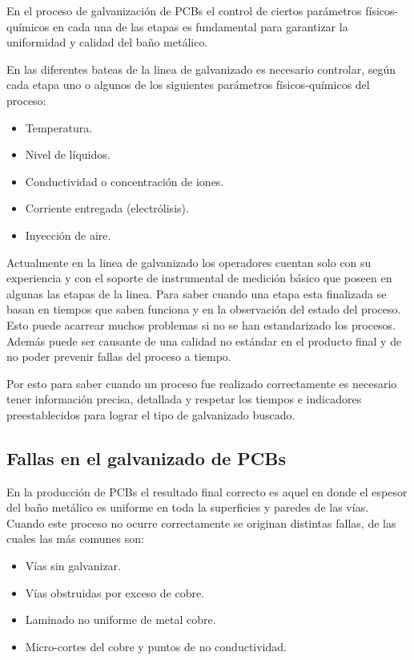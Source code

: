 En el proceso de galvanización de PCBs el control de ciertos parámetros físicos-químicos en cada una de las etapas es fundamental para garantizar la uniformidad y calidad del baño metálico. 

En las diferentes bateas de la linea de galvanizado es necesario controlar, según cada etapa uno o algunos de los siguientes parámetros físicos-químicos del proceso:
\begin{itemize}
	\item Temperatura.
	\item Nivel de líquidos.
	\item Conductividad o concentración de iones.
	\item Corriente entregada (electrólisis).
	\item Inyección de aire.
\end{itemize}

Actualmente en la linea de galvanizado los operadores cuentan solo con su experiencia y con el soporte de instrumental de medición básico que poseen en algunas las etapas de la linea. Para saber cuando una etapa esta finalizada se basan en tiempos que saben funciona y en la observación del estado del proceso. Esto puede acarrear muchos problemas si no se han estandarizado los procesos. Además puede ser causante de una calidad no estándar en el producto final y de no poder prevenir fallas del proceso a tiempo.
 
Por esto para saber cuando un proceso fue realizado correctamente es necesario tener información precisa, detallada y respetar los tiempos e indicadores preestablecidos para lograr el tipo de galvanizado buscado. 

\subsection{ Fallas en el galvanizado de PCBs }

En la producción de PCBs el resultado final correcto es aquel en donde el espesor del baño metálico es uniforme en toda la superficies y paredes de las vías. Cuando este proceso no ocurre correctamente se originan distintas fallas, de las cuales las más comunes son:
\begin{itemize}
	\item Vías sin galvanizar.
	\item Vías obstruidas por exceso de cobre.
	\item Laminado no uniforme de metal cobre.
	\item Micro-cortes del cobre y puntos de no conductividad.
\end{itemize}

